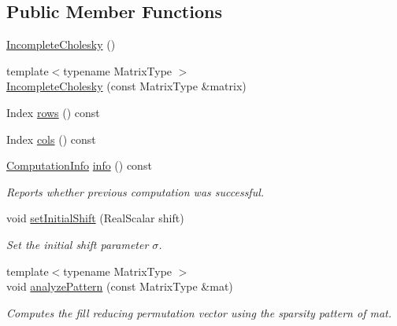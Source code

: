 \subsection*{Public Member Functions}
\begin{DoxyCompactItemize}
\item 
\mbox{\hyperlink{class_eigen_1_1_incomplete_cholesky_adaaa3975b8cf53f910d6a3344af92379}{Incomplete\+Cholesky}} ()
\item 
{\footnotesize template$<$typename Matrix\+Type $>$ }\\\mbox{\hyperlink{class_eigen_1_1_incomplete_cholesky_a757499fc814988a5b112b1f34d0295e1}{Incomplete\+Cholesky}} (const Matrix\+Type \&matrix)
\item 
Index \mbox{\hyperlink{class_eigen_1_1_incomplete_cholesky_a4780a83266c871782595081021268b5a}{rows}} () const
\item 
Index \mbox{\hyperlink{class_eigen_1_1_incomplete_cholesky_a0d66a1c8e340617e7ff404e63186fedb}{cols}} () const
\item 
\mbox{\hyperlink{group__enums_ga85fad7b87587764e5cf6b513a9e0ee5e}{Computation\+Info}} \mbox{\hyperlink{class_eigen_1_1_incomplete_cholesky_ada0e68cb22601849464506f5986a88c1}{info}} () const
\begin{DoxyCompactList}\small\item\em Reports whether previous computation was successful. \end{DoxyCompactList}\item 
\mbox{\label{class_eigen_1_1_incomplete_cholesky_a409c9586e7d29566dda2c8f5e38a1228}} 
void \mbox{\hyperlink{class_eigen_1_1_incomplete_cholesky_a409c9586e7d29566dda2c8f5e38a1228}{set\+Initial\+Shift}} (Real\+Scalar shift)
\begin{DoxyCompactList}\small\item\em Set the initial shift parameter $ \sigma $. \end{DoxyCompactList}\item 
\mbox{\label{class_eigen_1_1_incomplete_cholesky_a702560ecdddef77dc51d20ab22bd974e}} 
{\footnotesize template$<$typename Matrix\+Type $>$ }\\void \mbox{\hyperlink{class_eigen_1_1_incomplete_cholesky_a702560ecdddef77dc51d20ab22bd974e}{analyze\+Pattern}} (const Matrix\+Type \&mat)
\begin{DoxyCompactList}\small\item\em Computes the fill reducing permutation vector using the sparsity pattern of {\itshape mat}. \end{DoxyCompactList}\item 

\end{DoxyCompactItemize}
